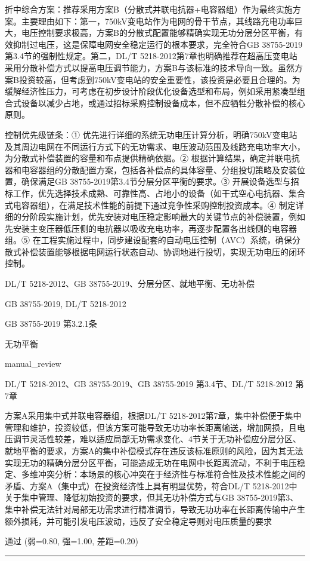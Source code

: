 \documentclass[11pt,a4paper]{ctexart}
\begin{document}
\begin{description}[leftmargin=1.5em,style=nextline,font=\normalfont]
折中综合方案：推荐采用方案B（分散式并联电抗器+电容器组）作为最终实施方案。主要理由如下：第一，750kV变电站作为电网的骨干节点，其线路充电功率巨大，电压控制要求极高，方案B的分散式配置能够精确实现无功分层分区平衡，有效抑制过电压，这是保障电网安全稳定运行的根本要求，完全符合GB 38755-2019第3.4节的强制性规定。第二，DL/T 5218-2012第7章也明确推荐在超高压变电站采用分散补偿方式以提高电压调节能力，方案B与该标准的技术导向一致。虽然方案B投资较高，但考虑到750kV变电站的安全重要性，该投资是必要且合理的。为缓解经济性压力，可考虑在初步设计阶段优化设备选型和布局，例如采用紧凑型组合式设备以减少占地，或通过招标采购控制设备成本，但不应牺牲分散补偿的核心原则。

控制优先级链条：① 优先进行详细的系统无功电压计算分析，明确750kV变电站及其周边电网在不同运行方式下的无功需求、电压波动范围及线路充电功率大小，为分散式补偿装置的容量和布点提供精确依据。② 根据计算结果，确定并联电抗器和电容器组的分散配置方案，包括各补偿点的具体容量、分组投切策略及安装位置，确保满足GB 38755-2019第3.4节分层分区平衡的要求。③ 开展设备选型与招标工作，优先选择技术成熟、可靠性高、占地小的设备（如干式空心电抗器、集合式电容器组），在满足技术性能的前提下通过竞争性采购控制投资成本。④ 制定详细的分阶段实施计划，优先安装对电压稳定影响最大的关键节点的补偿装置，例如先安装主变压器低压侧的电抗器以吸收充电功率，再逐步配置各出线侧的电容器组。⑤ 在工程实施过程中，同步建设配套的自动电压控制（AVC）系统，确保分散式补偿装置能够根据电网运行状态自动、协调地进行投切，实现无功电压的闭环控制。
  \item[KW:] DL/T 5218-2012、GB 38755-2019、分层分区、就地平衡、无功补偿
  \item[标准:] GB 38755-2019, DL/T 5218-2012
  \item[条款溯源:] GB 38755-2019 第3.2.1条
  \item[主题:] 无功平衡
  \item[评分方式:] manual\_review
  \item[Rubric条款:] DL/T 5218-2012、GB 38755-2019、GB 38755-2019 第3.4节、DL/T 5218-2012 第7章
  \item[Rubric判据:] 方案A采用集中式并联电容器组，根据DL/T 5218-2012第7章，集中补偿便于集中管理和维护，投资较低，但该方案可能导致无功功率长距离输送，增加网损，且电压调节灵活性较差，难以适应局部无功需求变化、4节关于无功补偿应分层分区、就地平衡的要求，方案A的集中补偿模式存在违反该标准原则的风险，因为其无法实现无功的精确分层分区平衡，可能造成无功在电网中长距离流动，不利于电压稳定、多维冲突分析：本场景的核心冲突在于经济性与标准符合性及技术性能之间的矛盾、方案A（集中式）在投资经济性上具有明显优势，符合DL/T 5218-2012中关于集中管理、降低初始投资的要求，但其无功补偿方式与GB 38755-2019第3、集中补偿无法针对局部无功需求进行精准调节，导致无功功率在长距离传输中产生额外损耗，并可能引发电压波动，违反了安全稳定导则对电压质量的要求
  \item[LJ判定:] 通过 (弱=0.80, 强=1.00, 差距=0.20)
\end{description}
\vspace{4pt}
\hrule
\vspace{6pt}
\end{document}

